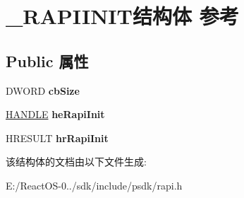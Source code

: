 \hypertarget{struct___r_a_p_i_i_n_i_t}{}\section{\+\_\+\+R\+A\+P\+I\+I\+N\+I\+T结构体 参考}
\label{struct___r_a_p_i_i_n_i_t}
\subsection*{Public 属性}
\begin{DoxyCompactItemize}
\item 
\mbox{\label{struct___r_a_p_i_i_n_i_t_a0f2416a4d6e4b34a4e8170928afee445}} 
D\+W\+O\+RD {\bfseries cb\+Size}
\item 
\mbox{\label{struct___r_a_p_i_i_n_i_t_a10a3243724d38f3393839df96ba344ec}} 
\hyperlink{interfacevoid}{H\+A\+N\+D\+LE} {\bfseries he\+Rapi\+Init}
\item 
\mbox{\label{struct___r_a_p_i_i_n_i_t_adf066f5f041e3bcb6e32707f8bb172ed}} 
H\+R\+E\+S\+U\+LT {\bfseries hr\+Rapi\+Init}
\end{DoxyCompactItemize}


该结构体的文档由以下文件生成\+:\begin{DoxyCompactItemize}
\item 
E\+:/\+React\+O\+S-\/0../sdk/include/psdk/rapi.\+h\end{DoxyCompactItemize}
